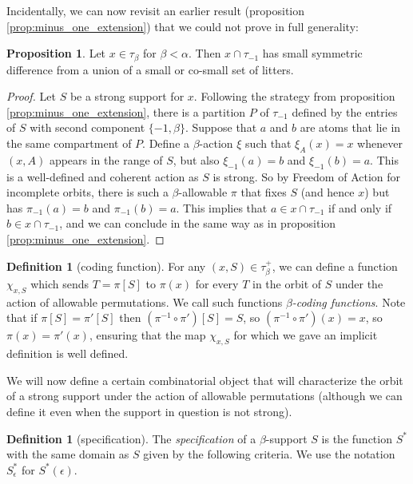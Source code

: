 \documentclass{article}
\theoremstyle{definition}
\newtheorem{proposition}[theorem]{Proposition}
\newtheorem{definition}[theorem]{Definition}
\theoremstyle{remark}
\begin{document}
{Incidentally, we can now revisit an earlier result (proposition \ref{prop:minus_one_extension}) that we could not prove in full generality:
\begin{proposition}\label{prop:minus_one_extension_better}
  Let $x \in \tau_\beta$ for $\beta < \alpha$.
  Then $x \cap \tau_{-1}$ has small symmetric difference from a union of a small or co-small set of litters.
\end{proposition}
\begin{proof}
  Let $S$ be a strong support for $x$.
  Following the strategy from proposition \ref{prop:minus_one_extension}, there is a partition $P$ of $\tau_{-1}$ defined by the entries of $S$ with second component $\{-1, \beta\}$.
  Suppose that $a$ and $b$ are atoms that lie in the same compartment of $P$.
  Define a $\beta$-action $\xi$ such that $\xi_A(x) = x$ whenever \( (x, A) \) appears in the range of \( S \), but also \( \xi_{-1}(a) = b \) and \( \xi_{-1}(b) = a \).
  This is a well-defined and coherent action as $S$ is strong.
  So by Freedom of Action for incomplete orbits, there is such a $\beta$-allowable $\pi$ that fixes $S$ (and hence $x$) but has $\pi_{-1}(a) = b$ and $\pi_{-1}(b) = a$.
  This implies that $a \in x \cap \tau_{-1}$ if and only if $b \in x \cap \tau_{-1}$, and we can conclude in the same way as in proposition \ref{prop:minus_one_extension}.
\end{proof}

\begin{definition}[coding function]\label{def:coding_function}
For any $(x, S) \in \tau_\beta^+$, we can define a function $\chi_{x,S}$ which sends $T=\pi[S]$ to $\pi(x)$ for every $T$ in the orbit of $S$ under
the action of allowable permutations.  We call such functions {\em $\beta$-coding functions\/}.  Note that if $\pi[S]=\pi'[S]$ then $(\pi^{-1}\circ \pi')[S]= S$, so
$(\pi^{-1}\circ \pi')(x)= x$, so $\pi(x)=\pi'(x)$, ensuring that the map $\chi_{x,S}$ for which we gave an implicit definition is well defined.
\end{definition}

We will now define a certain combinatorial object that will characterize the orbit of a strong support under the action of allowable permutations (although we can define it even when the support in question is not strong).

\begin{definition}[specification]\label{def:spec}
The {\em specification\/} of a $\beta$-support $S$ is the function $S^*$ with the same domain as $S$ given by the following criteria.
We use the notation $S^*_\epsilon$ for $S^*(\epsilon)$.


\end{definition}}
\end{document}
